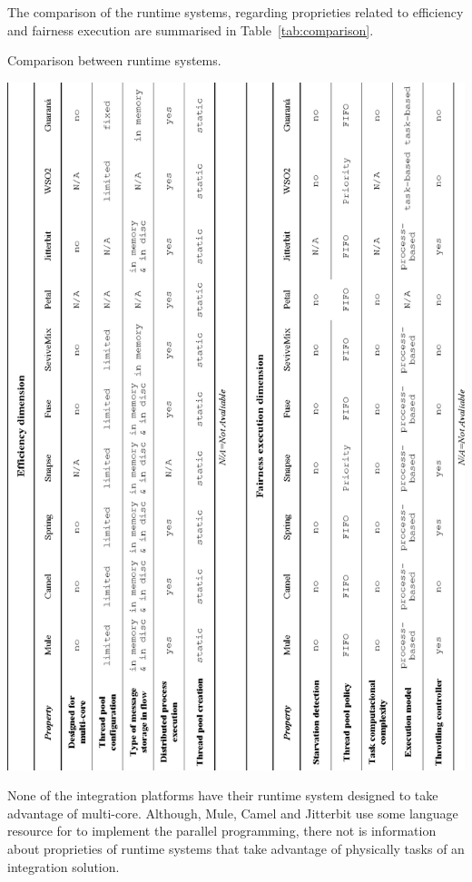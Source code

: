 The comparison of the runtime systems, regarding proprieties related to efficiency and fairness execution are summarised in Table~\ref{tab:comparison}.
\begin{table}[htbp]
	\centering
	\caption{Comparison between runtime systems.}
    \includegraphics[scale=0.8]{./figs/table_dimensions_v.eps}
	\label{tab:comparison}
\end{table}

None of the integration platforms have their runtime system designed to take advantage of multi-core. Although, Mule, Camel and Jitterbit use some language resource for to implement the parallel programming, there not is information about proprieties of runtime systems that take advantage of physically tasks of an integration solution.


